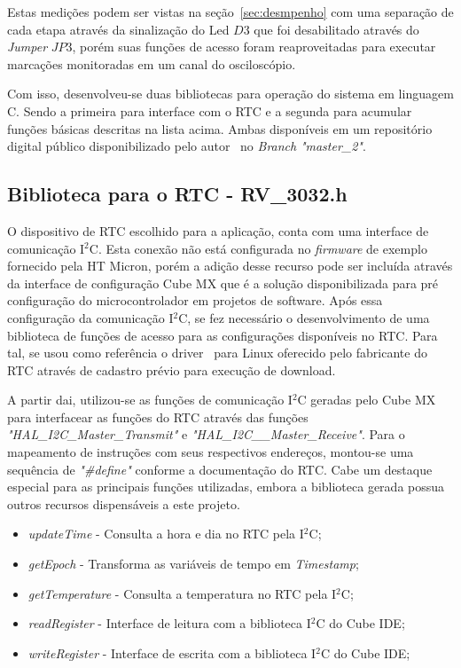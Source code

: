 Estas medições podem ser vistas na seção~\ref{sec:desmpenho} com uma separação de cada etapa através da sinalização do Led $D3$ que foi desabilitado através do \textit{Jumper} $JP3$, porém suas funções de acesso foram reaproveitadas para executar marcações monitoradas em um canal do osciloscópio.

Com isso, desenvolveu-se duas bibliotecas para operação do sistema em linguagem C. Sendo a primeira para interface com o RTC e a segunda para acumular funções básicas descritas na lista acima. Ambas disponíveis em um repositório digital público disponibilizado pelo autor~ no \textit{Branch} \textit{"master\_2"}.

\subsection{Biblioteca para o RTC - RV\_3032.h}
O dispositivo de RTC escolhido para a aplicação, conta com uma interface de comunicação I$^2$C. Esta conexão não está configurada no \textit{firmware} de exemplo fornecido pela HT Micron, porém a adição desse recurso pode ser incluída através da interface de configuração Cube MX que é a solução disponibilizada para pré configuração do microcontrolador em projetos de software.
Após essa configuração da comunicação I$^2$C, se fez necessário o desenvolvimento de uma biblioteca de funções de acesso para as configurações disponíveis no RTC.
Para tal, se usou como referência o driver~\cite{rtcdriver} para Linux oferecido pelo fabricante do RTC através de cadastro prévio para execução de download. 

A partir dai, utilizou-se as funções de comunicação I$^2$C geradas pelo Cube MX para interfacear as funções do RTC através das funções \textit{"HAL\_I2C\_Master\_Transmit"} e \textit{"HAL\_I2C\_\_Master\_Receive"}. Para o mapeamento de instruções com seus respectivos endereços, montou-se uma sequência de \textit{"\#define"} conforme a documentação do RTC. Cabe um destaque especial para as principais funções utilizadas, embora a biblioteca gerada possua outros recursos dispensáveis a este projeto.
\begin{itemize}
    \item \textit{updateTime} - Consulta a hora e dia no RTC pela I$^2$C;
    \item \textit{getEpoch} - Transforma as variáveis de tempo em \textit{Timestamp};
    \item \textit{getTemperature} - Consulta a temperatura no RTC pela I$^2$C;
    \item \textit{readRegister} - Interface de leitura com a biblioteca I$^2$C do Cube IDE;
    \item \textit{writeRegister} - Interface de escrita com a biblioteca I$^2$C do Cube IDE;
\end{itemize}

